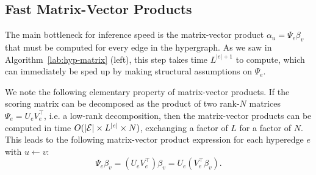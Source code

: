 \documentclass{article}
\begin{document}
\subsection{Fast Matrix-Vector Products}
The main bottleneck for inference speed is the matrix-vector product $\alpha_u = \Psi_e\beta_v$ that must be computed for every edge in the hypergraph.
As we saw in Algorithm~\ref{lab:hyp-matrix} (left), this step takes time $L^{|e|+1}$ to compute,
which can immediately be sped up by making structural assumptions
on $\Psi_e$.

We note the following elementary property of matrix-vector products.
If the scoring matrix can be decomposed as the product
of two rank-$N$ matrices $\Psi_e = U_e V_e^\top$,
i.e. a low-rank decomposition,
then the matrix-vector products can be computed in time
$O(|{\cal E}|\times L^{|e|}\times N)$,
exchanging a factor of $L$ for a factor of $N$.
This leads to the following matrix-vector product expression for each hyperedge $e$ with $u\leftarrow v$:
\begin{equation}
    \label{eqn:hypergraph-update-kernel-matrix}
    \Psi_e\beta_v =  \left(U_e V_e^\top\right) \beta_v =  U_e\left(V_e^\top\beta_v\right).
\end{equation}
\end{document}
